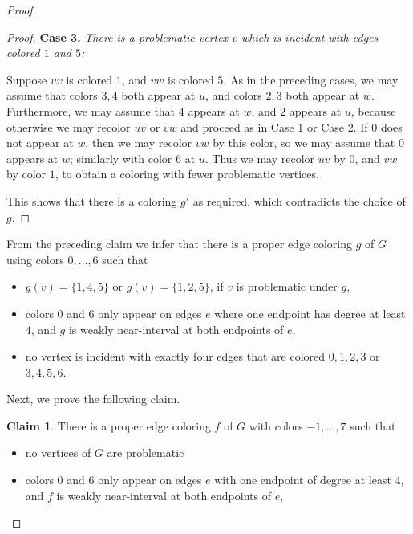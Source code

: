 \documentclass[12pt]{article}
\theoremstyle{plain}
\theoremstyle{definition}
\newtheorem{claim}[theorem]{Claim}
\numberwithin{equation}{section}
\begin{document}
\begin{proof}
\begin{proof}
	\bigskip

	{\bf Case 3.}	 {\em There is a problematic vertex $v$ which is incident with edges colored $1$ and $5$:}
	
	Suppose $uv$ is colored $1$, and $vw$ is colored $5$. As in the preceding cases, we may assume that
	colors $3,4$ both appear at $u$, and colors $2,3$ both appear at $w$. Furthermore, we may
	assume that $4$ appears at $w$, and $2$ appears at $u$, because otherwise we may recolor $uv$
	or $vw$ and proceed as in Case 1 or Case 2. If $0$ does not appear at $w$, then we may recolor $vw$
	by this color, so we may assume that $0$ appears at $w$; similarly with color $6$ at $u$.
	Thus we may recolor $uv$ by $0$, and $vw$ by color $1$, to obtain a coloring with fewer
	problematic vertices.

	\bigskip
	
	This shows that there is a coloring $g'$ as required, which contradicts the choice of $g$. 
\end{proof}


	From the preceding claim we infer that
	there is a proper edge coloring $g$ of $G$ using colors $0,\dots, 6$ such that
\begin{itemize}

	\item $g(v)=\{1,4,5\}$ or $g(v)=\{1,2,5\}$, if $v$ is problematic under $g$,

	\item colors $0$ and $6$ only appear on edges $e$ where one endpoint has degree at least $4$, and $g$
	is weakly near-interval at both endpoints of $e$,

	\item no vertex is incident with exactly four edges that are colored $0,1,2,3$ or $3,4,5,6$.

\end{itemize}

	Next, we prove the following claim.


\begin{claim}
\label{cl:prob3}
	There is a proper edge coloring $f$ of $G$ with colors $-1, \dots, 7$ such that
\begin{itemize}
	\item[(i)] no vertices of $G$ are problematic

	\item[(ii)] colors $0$ and $6$ only appear on edges $e$ with one endpoint of degree at least $4$, 
	and $f$ is weakly near-interval at both endpoints of $e$, 


\end{itemize}
\end{claim}
\end{proof}
\end{document}

